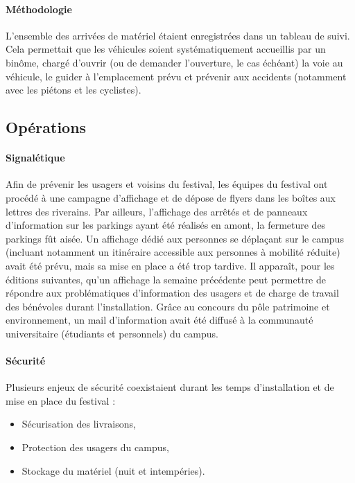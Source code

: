 \documentclass[12pt,a4paper]{report}
\begin{document}
\paragraph{Méthodologie}

L'ensemble des arrivées de matériel étaient enregistrées dans un tableau de suivi. Cela permettait que les véhicules soient systématiquement accueillis par un binôme, chargé d'ouvrir (ou de demander l'ouverture, le cas échéant) la voie au véhicule, le guider à l'emplacement prévu et prévenir aux accidents (notamment avec les piétons et les cyclistes).

\subsection{Opérations}

\paragraph{Signalétique}

Afin de prévenir les usagers et voisins du festival, les équipes du festival ont procédé à une campagne d'affichage et de dépose de flyers dans les boîtes aux lettres des riverains. Par ailleurs, l'affichage des arrêtés et de panneaux d'information sur les parkings ayant été réalisés en amont, la fermeture des parkings fût aisée. Un affichage dédié aux personnes se déplaçant sur le campus (incluant notamment un itinéraire accessible aux personnes à mobilité réduite) avait été prévu, mais sa mise en place a été trop tardive. Il apparaît,  pour les éditions suivantes, qu'un affichage la semaine précédente peut permettre de répondre aux problématiques d'information des usagers et de charge de travail des bénévoles durant l'installation. Grâce au concours du pôle patrimoine et environnement, un mail d'information avait été diffusé à la communauté universitaire (étudiants et personnels) du campus.

\paragraph{Sécurité}

Plusieurs enjeux de sécurité coexistaient durant les temps d'installation et de mise en place du festival : 
\begin{itemize}
\item Sécurisation des livraisons,
\item Protection des usagers du campus,
\item Stockage du matériel (nuit et intempéries).\\
\end{itemize}
\end{document}
